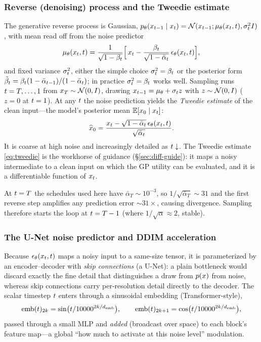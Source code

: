 \subsubsection{Reverse (denoising) process and the Tweedie estimate}
The generative reverse process is Gaussian,
$p_{\theta}(x_{t-1}\mid x_{t})=\mathcal{N}(x_{t-1};\mu_{\theta}(x_{t},t),\sigma_{t}^{2}I)$,
with mean read off from the noise predictor
\begin{equation}
\mu_{\theta}(x_{t},t)=\frac{1}{\sqrt{1-\beta_{t}}}
   \Big[\,x_{t}-\frac{\beta_{t}}{\sqrt{1-\bar{\alpha}_{t}}}\,\epsilon_{\theta}(x_{t},t)\Big],
\label{eq:reverse-mean}
\end{equation}
and fixed variance $\sigma_{t}^{2}$, either the simple choice
$\sigma_{t}^{2}=\beta_{t}$ or the posterior form
$\tilde\beta_{t}=\beta_{t}(1-\bar\alpha_{t-1})/(1-\bar{\alpha}_{t})$; in practice
$\sigma_{t}^{2}=\beta_{t}$ works well. Sampling runs $t=T,\dots,1$ from
$x_{T}\sim\mathcal{N}(0,I)$, drawing $x_{t-1}=\mu_{\theta}+\sigma_{t}z$ with
$z\sim\mathcal{N}(0,I)$ ($z=0$ at $t=1$). At any $t$ the noise prediction yields the
\emph{Tweedie estimate} of the clean input---the model's posterior mean
$\mathbb{E}[x_{0}\mid x_{t}]$:
\begin{equation}
\widehat{x}_{0}=\frac{x_{t}-\sqrt{1-\bar{\alpha}_{t}}\,\epsilon_{\theta}(x_{t},t)}{\sqrt{\bar{\alpha}_{t}}}.
\label{eq:tweedie}
\end{equation}
It is coarse at high noise and increasingly detailed as $t\downarrow$. The
Tweedie estimate \eqref{eq:tweedie} is the workhorse of guidance
(\S\ref{sec:diff-guide}): it maps a noisy intermediate to a clean input on which
the GP utility can be evaluated, and it is a differentiable function of $x_{t}$.

\begin{remark}[$T-1$ start]
At $t=T$ the schedules used here have $\bar\alpha_{T}\!\sim\!10^{-3}$, so
$1/\sqrt{\bar\alpha_{T}}\!\sim\!31$ and the first reverse step amplifies any
prediction error $\sim\!31\times$, causing divergence. Sampling therefore starts
the loop at $t=T-1$ (where $1/\sqrt{\alpha}\!\approx\!2$, stable).
\end{remark}

\subsubsection{The U-Net noise predictor and DDIM acceleration}
Because $\epsilon_{\theta}(x_{t},t)$ maps a noisy input to a same-size tensor, it is
parameterized by an encoder--decoder with \emph{skip connections} (a U-Net): a
plain bottleneck would discard exactly the fine detail that distinguishes a draw
from $p(x)$ from noise, whereas skip connections carry per-resolution detail
directly to the decoder. The scalar timestep $t$ enters through a sinusoidal
embedding (Transformer-style),
\[
\mathrm{emb}(t)_{2k}=\sin\!\big(t/10000^{2k/d_{\mathrm{emb}}}\big),
\qquad
\mathrm{emb}(t)_{2k+1}=\cos\!\big(t/10000^{2k/d_{\mathrm{emb}}}\big),
\]
passed through a small MLP and \emph{added} (broadcast over space) to each block's
feature map---a global ``how much to activate at this noise level'' modulation.

